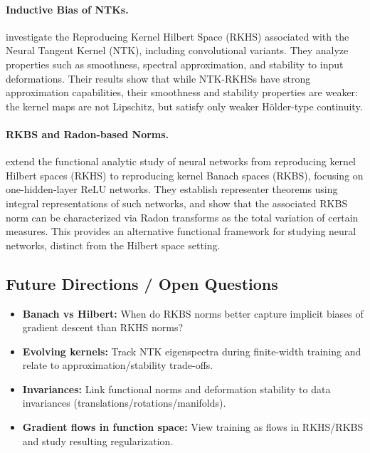 \documentclass[11pt]{article}
\begin{document}
\paragraph{Inductive Bias of NTKs.}
\citet{bietti2019inductive} investigate the Reproducing Kernel Hilbert Space (RKHS) associated
with the Neural Tangent Kernel (NTK), including convolutional variants. They analyze properties
such as smoothness, spectral approximation, and stability to input deformations. Their results show
that while NTK-RKHSs have strong approximation capabilities, their smoothness and stability
properties are weaker: the kernel maps are not Lipschitz, but satisfy only weaker H\"older-type
continuity.

\paragraph{RKBS and Radon-based Norms.}
\citet{bartolucci2023rkbs} extend the functional analytic study of neural networks
from reproducing kernel Hilbert spaces (RKHS) to reproducing kernel Banach spaces (RKBS),
focusing on one-hidden-layer ReLU networks. They establish representer theorems using integral
representations of such networks, and show that the associated RKBS norm can be characterized
via Radon transforms as the total variation of certain measures. This provides an alternative
functional framework for studying neural networks, distinct from the Hilbert space setting.

\subsection{Future Directions / Open Questions}
\begin{itemize}
	\item \textbf{Banach vs Hilbert:} When do RKBS norms better capture implicit biases of gradient descent than RKHS norms?
	\item \textbf{Evolving kernels:} Track NTK eigenspectra during finite-width training and relate to approximation/stability trade-offs.
	\item \textbf{Invariances:} Link functional norms and deformation stability to data invariances (translations/rotations/manifolds).
	\item \textbf{Gradient flows in function space:} View training as flows in RKHS/RKBS and study resulting regularization.
\end{itemize}



\end{document}
